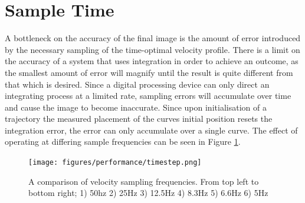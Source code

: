 \section{Sample Time}
A bottleneck on the accuracy of the final image is the amount of error introduced by the necessary sampling of the time-optimal velocity profile. There is a limit on the accuracy of a system that uses integration in order to achieve an outcome, as the smallest amount of error will magnify until the result is quite different from that which is desired. Since a digital processing device can only direct an integrating process at a limited rate, sampling errors will accumulate over time and cause the image to become inaccurate. Since upon initialisation of a trajectory the measured placement of the curves initial position resets the integration error, the error can only accumulate over a single curve. The effect of operating at differing sample frequencies can be seen in Figure \ref{fig:timestep}.

\begin{figure}[htbp]  
\texttt{[image: figures/performance/timestep.png]}
\caption[Comparison of differing velocity sampling frequencies]{A comparison of velocity sampling frequencies. From top left to bottom right; 1) 50hz 2) 25Hz 3) 12.5Hz 4) 8.3Hz 5) 6.6Hz 6) 5Hz
\label{fig:timestep}}
\end{figure}  

